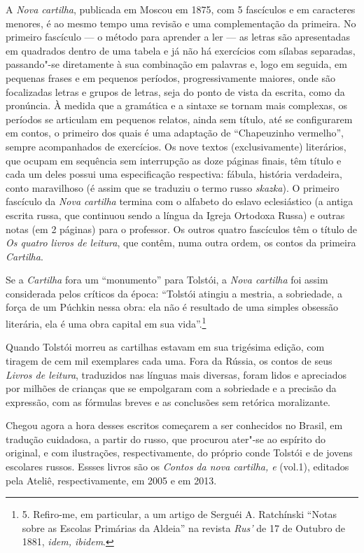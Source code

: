 A \emph{Nova cartilha}, publicada em Moscou em 1875, com 5 fascículos e
em caracteres menores, é ao mesmo tempo uma revisão e uma complementação
da primeira. No primeiro fascículo --- o método para aprender a ler --- as
letras são apresentadas em quadrados dentro de uma tabela e já não há
exercícios com sílabas separadas, passando"-se diretamente à sua
combinação em palavras e, logo em seguida, em pequenas frases e em
pequenos períodos, progressivamente maiores, onde são focalizadas letras
e grupos de letras, seja do ponto de vista da escrita, como da
pronúncia. À medida que a gramática e a sintaxe se tornam mais
complexas, os períodos se articulam em pequenos relatos, ainda sem
título, até se configurarem em contos, o primeiro dos quais é uma
adaptação de ``Chapeuzinho vermelho'', sempre acompanhados de
exercícios. Os nove textos (exclusivamente) literários, que ocupam em
sequência sem interrupção as doze páginas finais, têm título e cada um
deles possui uma especificação respectiva: fábula, história verdadeira,
conto maravilhoso (é assim que se traduziu o termo
russo \emph{skazka}). O primeiro fascículo da \emph{Nova
cartilha} termina com o alfabeto do eslavo eclesiástico (a antiga
escrita russa, que continuou sendo a língua da Igreja Ortodoxa Russa) e
outras notas (em 2 páginas) para o professor. Os outros quatro
fascículos têm o título de \emph{Os quatro livros de leitura}, que
contêm, numa outra ordem, os contos da primeira \emph{Cartilha}.

Se a \emph{Cartilha} fora um ``monumento'' para Tolstói, a \emph{Nova
cartilha} foi assim considerada pelos críticos da época: ``Tolstói
atingiu a mestria, a sobriedade, a força de um Púchkin nessa obra: ela
não é resultado de uma simples obsessão literária, ela é uma obra
capital em sua vida''.\footnote{5. Refiro-me, em particular, a um artigo
  de Serguéi A. Ratchínski ``Notas sobre as Escolas Primárias da
  Aldeia'' na revista \emph{Rus'} de 17 de Outubro de 1881, \emph{idem,
  ibidem}.}

Quando Tolstói morreu as cartilhas estavam em sua trigésima edição, com
tiragem de cem mil exemplares cada uma. Fora da Rússia, os contos de
seus \emph{Livros de leitura}, traduzidos nas línguas mais diversas,
foram lidos e apreciados por milhões de crianças que se empolgaram com a
sobriedade e a precisão da expressão, com as fórmulas breves e as
conclusões sem retórica moralizante.

Chegou agora a hora desses escritos começarem a ser conhecidos no Brasil,
em tradução cuidadosa, a partir do russo, que procurou ater"-se ao
espírito do original, e com ilustrações, respectivamente, do próprio
conde Tolstói e de jovens escolares russos. Essses livros são os
\emph{Contos da nova cartilha,  e } (vol.1), editados pela Ateliê,
respectivamente, em 2005 e em 2013.



